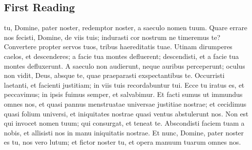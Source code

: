 \subsection{First Reading}\label{proper-first-reading}
\begin{latinproper}
 tu, Domine, pater noster, redemptor noster, a saeculo nomen tuum. Quare errare nos fecisti, Domine, de viis tuis; indurasti cor nostrum ne timeremus te? Convertere propter servos tuos, tribus haereditatis tuae.  Utinam dirumperes caelos, et descenderes; a facie tua montes defluerent;   descendisti, et a facie tua montes defluxerunt. A saeculo non audierunt, neque auribus perceperunt; oculus non vidit, Deus, absque te, quae praeparasti exspectantibus te. Occurristi laetanti, et facienti justitiam; in viis tuis recordabuntur tui. Ecce tu iratus es, et peccavimus; in ipsis fuimus semper, et salvabimur. Et facti sumus ut immundus omnes nos, et quasi pannus menstruatae universae justitiae nostrae; et cecidimus quasi folium universi, et iniquitates nostrae quasi ventus abstulerunt nos. Non est qui invocet nomen tuum; qui consurgat, et teneat te. Abscondisti faciem tuam a nobis, et allisisti nos in manu iniquitatis nostrae. Et nunc, Domine, pater noster es tu, nos vero lutum; et fictor noster tu, et opera manuum tuarum omnes nos.
\end{latinproper}
